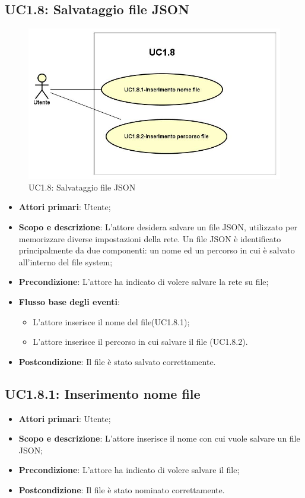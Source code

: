 \subsection{UC1.8: Salvataggio file JSON} 
\begin{figure} [H]
	\centering
	\includegraphics[scale=0.45]{Img/UC1-8} 
	\caption{UC1.8: Salvataggio file JSON} \label{} 
\end{figure} 
\begin{itemize} 
	\item{\textbf{Attori primari}: Utente;} 
	\item{\textbf{Scopo e descrizione}: L'attore desidera salvare un file JSON, utilizzato per memorizzare diverse impostazioni della rete. Un file JSON è identificato principalmente da due componenti: un nome ed un percorso in cui è salvato all'interno del file system;} 
	\item{\textbf{Precondizione}: L'attore ha indicato di volere salvare la rete su file;} 
	\item{\textbf{Flusso base degli eventi}: } 
	\begin{itemize} 
		\item{L'attore inserisce il nome del file(UC1.8.1);} 
		\item{L'attore inserisce il percorso in cui salvare il file (UC1.8.2).} 
	\end{itemize} 
	\item{\textbf{Postcondizione}: Il file è stato salvato correttamente.} 
\end{itemize} 
\subsection{UC1.8.1: Inserimento nome file} 
\begin{itemize} 
	\item{\textbf{Attori primari}: Utente;} 
	\item{\textbf{Scopo e descrizione}: L'attore inserisce il nome con cui vuole salvare un file JSON;} 
	\item{\textbf{Precondizione}: L'attore ha indicato di volere salvare il file;} 
	\item{\textbf{Postcondizione}: Il file è stato nominato correttamente.} 
\end{itemize} 
